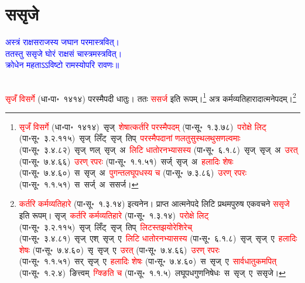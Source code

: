 \section[ससृजे]{ससृजे}
\centering\textcolor{blue}{अस्त्रं राक्षसराजस्य जघान परमास्त्रवित्।\nopagebreak\\
ततस्तु ससृजे घोरं राक्षसं चास्त्रमस्त्रवित्।\nopagebreak\\
क्रोधेन महताऽऽविष्टो रामस्योपरि रावणः॥}\nopagebreak\\
\\
\fontsize{14}{21}\selectfont\begin{sloppypar}\justifying\noindent\hspace{10mm} \textcolor{red}{सृजँ विसर्गे} (धा॰पा॰~१४१४) परस्मैपदी धातुः। ततः \textcolor{red}{ससर्ज} इति रूपम्।\footnote{\textcolor{red}{सृजँ विसर्गे} (धा॰पा॰~१४१४)~\arrow सृज्~\arrow \textcolor{red}{शेषात्कर्तरि परस्मैपदम्} (पा॰सू॰~१.३.७८)~\arrow \textcolor{red}{परोक्षे लिट्} (पा॰सू॰~३.२.११५)~\arrow सृज्~लिँट्~\arrow सृज्~तिप्~\arrow \textcolor{red}{परस्मैपदानां णलतुसुस्थलथुस\-णल्वमाः} (पा॰सू॰~३.४.८२)~\arrow सृज्~णल्~\arrow सृज्~अ~\arrow \textcolor{red}{लिटि धातोरनभ्यासस्य} (पा॰सू॰~६.१.८)~\arrow सृज्~सृज्~अ~\arrow \textcolor{red}{उरत्} (पा॰सू॰~७.४.६६)~\arrow \textcolor{red}{उरण् रपरः} (पा॰सू॰~१.१.५१)~\arrow सर्ज्~सृज्~अ~\arrow \textcolor{red}{हलादिः शेषः} (पा॰सू॰~७.४.६०)~\arrow स~सृज्~अ~\arrow \textcolor{red}{पुगन्त\-लघूपधस्य च} (पा॰सू॰~७.३.८६)~\arrow \textcolor{red}{उरण् रपरः} (पा॰सू॰~१.१.५१)~\arrow स~सर्ज्~अ~\arrow ससर्ज।} अत्र कर्म\-व्यतिहारादात्मनेपदम्।\footnote{\textcolor{red}{कर्तरि कर्मव्यतिहारे} (पा॰सू॰~१.३.१४) इत्यनेन। प्राप्त आत्मने\-पदे लिटि प्रथम\-पुरुष एक\-वचने \textcolor{red}{ससृजे} इति रूपम्। सृज्~\arrow \textcolor{red}{कर्तरि कर्मव्यतिहारे} (पा॰सू॰~१.३.१४)~\arrow \textcolor{red}{परोक्षे लिट्} (पा॰सू॰~३.२.११५)~\arrow सृज्~लिँट्~\arrow सृज्~तिप्~\arrow \textcolor{red}{लिटस्तझयोरेशिरेच्} (पा॰सू॰~३.४.८१)~\arrow सृज्~एश्~\arrow सृज्~ए~\arrow \textcolor{red}{लिटि धातोरनभ्यासस्य} (पा॰सू॰~६.१.८)~\arrow सृज्~सृज्~ए~\arrow \textcolor{red}{हलादिः शेषः} (पा॰सू॰~७.४.६०)~\arrow सृ~सृज्~ए~\arrow \textcolor{red}{उरत्} (पा॰सू॰~७.४.६६)~\arrow \textcolor{red}{उरण् रपरः} (पा॰सू॰~१.१.५१)~\arrow सर्~सृज्~ए~\arrow \textcolor{red}{हलादिः शेषः} (पा॰सू॰~७.४.६०)~\arrow स~सृज्~ए~\arrow \textcolor{red}{सार्वधातुकमपित्} (पा॰सू॰~१.२.४)~\arrow ङित्त्वम्~\arrow \textcolor{red}{ग्क्ङिति च} (पा॰सू॰~१.१.५)~\arrow लघूपध\-गुण\-निषेधः~\arrow स~सृज्~ए~\arrow ससृजे।}\end{sloppypar}
